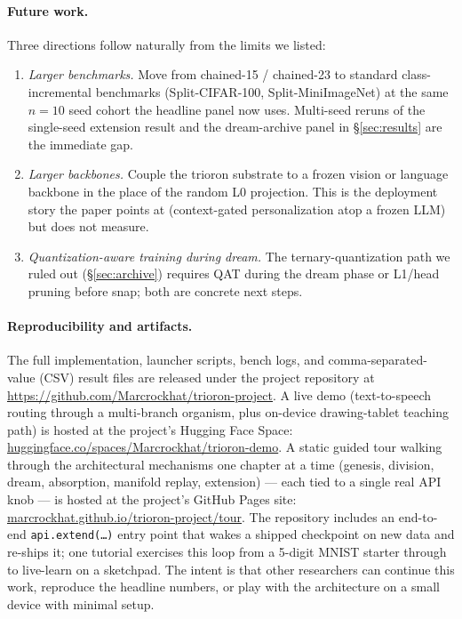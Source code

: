 \documentclass[11pt]{article}
\begin{document}
\paragraph{Future work.}
Three directions follow naturally from the limits we listed:

\begin{enumerate}[leftmargin=2em]
  \item \emph{Larger benchmarks.} Move from chained-15 / chained-23
        to standard class-incremental benchmarks (Split-CIFAR-100,
        Split-MiniImageNet) at the same $n = 10$ seed cohort the
        headline panel now uses. Multi-seed reruns of the
        single-seed extension result and the dream-archive panel in
        \S\ref{sec:results} are the immediate gap.
  \item \emph{Larger backbones.} Couple the trioron substrate to a
        frozen vision or language backbone in the place of the random
        L0 projection. This is the deployment story the paper points
        at (context-gated personalization atop a frozen LLM) but does
        not measure.
  \item \emph{Quantization-aware training during dream.} The
        ternary-quantization path we ruled out
        (\S\ref{sec:archive}) requires QAT during the dream phase or
        L1/head pruning before snap; both are concrete next steps.
\end{enumerate}

\paragraph{Reproducibility and artifacts.}
The full implementation, launcher scripts, bench logs, and
comma-separated-value (CSV) result files are released under the
project repository at
\url{https://github.com/Marcrockhat/trioron-project}. A live demo
(text-to-speech routing through a multi-branch organism, plus
on-device drawing-tablet teaching path) is hosted at the project's
Hugging Face Space:
\href{https://huggingface.co/spaces/Marcrockhat/trioron-demo}{huggingface.co/spaces/Marcrockhat/trioron-demo}.
A static guided tour walking through the architectural mechanisms
one chapter at a time (genesis, division, dream, absorption, manifold
replay, extension) --- each tied to a single real API knob --- is
hosted at the project's GitHub Pages site:
\href{https://marcrockhat.github.io/trioron-project/tour/}{marcrockhat.github.io/trioron-project/tour}. The repository
includes an end-to-end \texttt{api.extend(\dots)} entry point that
wakes a shipped checkpoint on new data and re-ships it; one tutorial
exercises this loop from a 5-digit MNIST starter through to live-learn
on a sketchpad. The intent is that other researchers can continue this
work, reproduce the headline numbers, or play with the architecture on
a small device with minimal setup.
\end{document}
